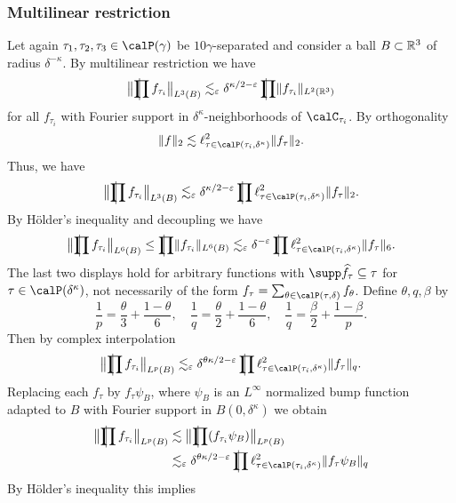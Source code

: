 \subsubsection{Multilinear restriction}
Let again $\tau_{1},\tau_{2},\tau_{3} \in \Part{\gamma}$ be $10\gamma$-separated and consider a ball $B \subset \mathbb{R}^{3}$ of radius $\delta^{-\kappa}$.
By multilinear restriction we have
\[
\norm[\big]{ \avprod f_{\tau_i} }_{L^{3}(B)}
\lesssim_{\epsilon}
\delta^{\kappa/2 -\epsilon} \avprod \norm{f_{\tau_i}}_{L^{2}(\R^{3})}
\]
for all $f_{\tau_i}$ with Fourier support in $\delta^{\kappa}$-neighborhoods of $\calC_{\tau_{i}}$.
By orthogonality
\[
\norm{ f }_2
\lesssim
\ell^{2}_{\tau \in \Part[\tau_{i}]{\delta^{\kappa}}} \norm{ f_{\tau} }_2.
\]
Thus, we have
\begin{equation*}
\norm[\big]{ \avprod f_{\tau_i} }_{L^{3}(B)}
\lesssim_\epsilon
\delta^{\kappa/2-\epsilon} \avprod \ell^{2}_{\tau \in \Part[\tau_{i}]{\delta^{\kappa}}} \norm{f_{\tau}}_{2}.
\end{equation*}
By H\"older's inequality and decoupling we have
\[
\norm[\big]{ \avprod f_{\tau_i} }_{L^{6}(B)}
\leq
\avprod \norm{ f_{\tau_i} }_{L^{6}(B)}
\lesssim_\epsilon
\delta^{-\epsilon} \avprod \ell^{2}_{\tau \in \Part[\tau_{i}]{\delta^{\kappa}}} \norm{f_{\tau}}_{6}.
\]
The last two displays hold for arbitrary functions with $\supp \widehat{f_{\tau}} \subseteq \tau$ for $\tau \in \Part{\delta^{\kappa}}$, not necessarily of the form $f_{\tau} = \sum_{\theta\in\Part[\tau]{\delta}} f_{\theta}$.
Define $\theta,q,\beta$ by
\[
\frac{1}{p} = \frac{\theta}{3} + \frac{1-\theta}{6},
\quad
\frac{1}{q} = \frac{\theta}{2} + \frac{1-\theta}{6},
\quad
\frac{1}{q} = \frac{\beta}{2} + \frac{1-\beta}{p}.
\]
Then by complex interpolation
\[
\norm[\big]{ \avprod f_{\tau_i} }_{L^{p}(B)}
\lesssim_\epsilon
\delta^{\theta \kappa/2-\epsilon} \avprod \ell^{2}_{\tau \in \Part[\tau_{i}]{\delta^{\kappa}}} \norm{f_{\tau}}_{q}.
\]
Replacing each $f_{\tau}$ by $f_{\tau}\psi_{B}$, where $\psi_{B}$ is an $L^{\infty}$ normalized bump function adapted to $B$ with Fourier support in $B(0,\delta^{\kappa})$ we obtain
\begin{align*}
\norm[\big]{ \avprod f_{\tau_i} }_{L^{p}(B)}
&\lesssim
\norm[\big]{ \avprod (f_{\tau_i}\psi_{B}) }_{L^{p}(B)}\\
&\lesssim_{\epsilon}
\delta^{\theta \kappa/2-\epsilon} \avprod \ell^{2}_{\tau \in \Part[\tau_{i}]{\delta^{\kappa}}} \norm{f_{\tau}\psi_{B}}_{q}
\end{align*}
By H\"older's inequality this implies
